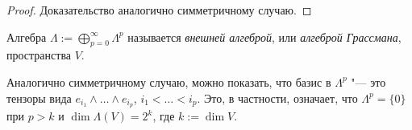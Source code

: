 \begin{proof}
	Доказательство аналогично симметричному случаю.
\end{proof}

\begin{definition}
	Алгебра $\Lambda := \bigoplus_{p = 0}^\infty\Lambda^p$ называется \textit{внешней алгеброй}, или \textit{алгеброй Грассмана}, пространства $V$.
\end{definition}

\begin{note}
	Аналогично симметричному случаю, можно показать, что базис в $\Lambda^p$ "--- это тензоры вида $e_{i_1} \land \dots \land e_{i_p}$, $i_1 < \dots < i_p$. Это, в частности, означает, что $\Lambda^p = \{0\}$ при $p > k$ и $\dim\Lambda(V) = 2^k$, где $k := \dim{V}$.
\end{note}